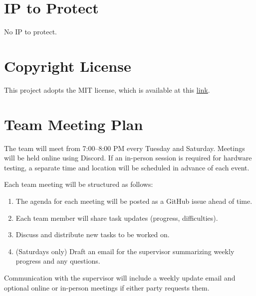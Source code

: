 \documentclass{article}
\begin{document}
\section{IP to Protect}


No IP to protect.

\section{Copyright License}


This project adopts the MIT license, which is available at this
\href{https://github.com/ZifanSi/vision-guided-tracker/blob/main/LICENSE}{link}.

\section{Team Meeting Plan}

The team will meet from 7:00–8:00 PM every Tuesday and Saturday. Meetings will
be held online using Discord. If an in-person session is required for hardware
testing, a separate time and location will be scheduled in advance of each
event.

Each team meeting will be structured as follows:

\begin{enumerate}
  \item The agenda for each meeting will be posted as a GitHub issue ahead of time.
  \item Each team member will share task updates (progress, difficulties).
  \item Discuss and distribute new tasks to be worked on.
  \item (Saturdays only) Draft an email for the supervisor summarizing weekly progress and any questions.
\end{enumerate}

Communication with the supervisor will include a weekly update email and
optional online or in-person meetings if either party requests them.

\end{document}
